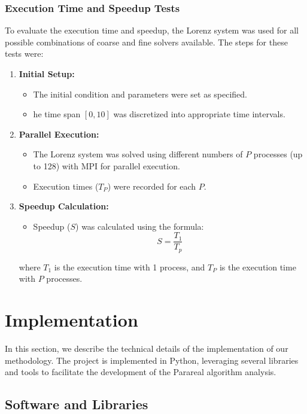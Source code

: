 \documentclass[a4paper,12pt,french]{article}
\begin{document}
\subsubsection{Execution Time and Speedup Tests}
To evaluate the execution time and speedup, the Lorenz system was used for all possible combinations of coarse and fine solvers available.
The steps for these tests were:
\begin{enumerate}
    \item \textbf{Initial Setup:}
        \begin{itemize}
            \item The initial condition and parameters were set as specified.
            \item he time span $[0,10]$ was discretized into appropriate time intervals.
        \end{itemize}
    \item \textbf{Parallel Execution:}
        \begin{itemize}
            \item The Lorenz system was solved using different numbers of $P$ processes (up to 128) with MPI for parallel execution.
            \item Execution times ($T_P$) were recorded for each $P$.
        \end{itemize}
    \item \textbf{Speedup Calculation:}
        \begin{itemize}
            \item Speedup ($S$) was calculated using the formula:
                \begin{equation}
                    S = \frac{T_1}{T_p}
                \end{equation}
        \end{itemize}
        where $T_1$ is the execution time with 1 process, and $T_P$ is the execution time with $P$ processes.
\end{enumerate}

\section{Implementation}
In this section, we describe the technical details of the implementation of our methodology. The project is implemented in Python, leveraging several libraries and tools to facilitate the development of the Parareal algorithm analysis.
\subsection{Software and Libraries}
\end{document}
